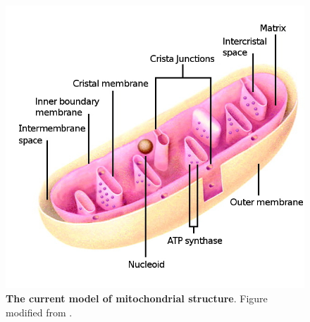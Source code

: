 \documentclass[12pt,twoside]{reedthesis}
\begin{document}
\begin{figure}[h]
    \begin{center}
        \includegraphics[scale=0.4]{../figures/cristae_logan_2006_edit.jpg}
    \end{center}
    \caption[The current model of mitochondrial structure]{\textbf{The current model of mitochondrial structure}. Figure modified from \citealp{perkins_recent_2000}.} 
    \label{org_structure}
\end{figure}
\end{document}
